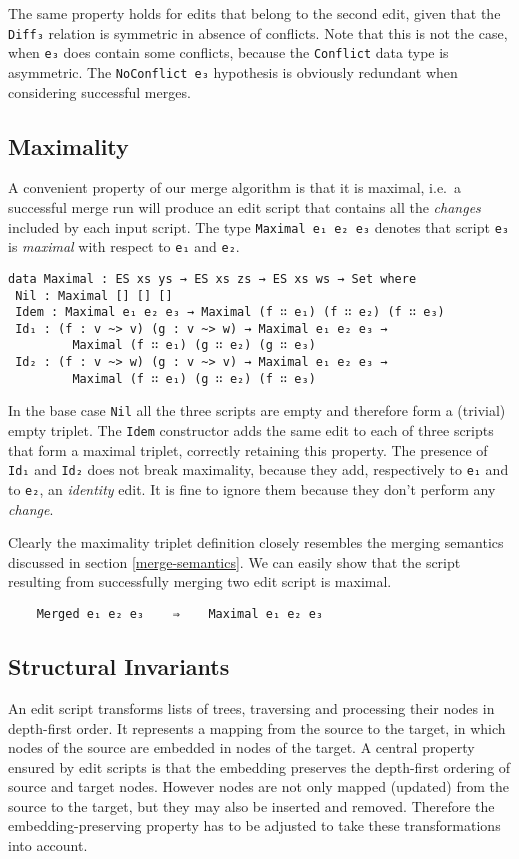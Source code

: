 \documentclass[preprint]{sigplanconf}
\begin{document}
    The same property holds for edits that belong to the second edit, given
    that the \texttt{Diff₃} relation is symmetric in absence of conflicts.	
    Note that this is not the case, when \texttt{e₃} does contain some conflicts,
    because the \texttt{Conflict} data type is asymmetric.
    The \texttt{NoConflict e₃} hypothesis is obviously redundant when
    considering successful merges.
    		
    \subsection{Maximality}
    A convenient property of our merge algorithm is that it is maximal, i.e.\ a successful 
    merge run will produce an edit script that contains all the \emph{changes} included
    by each input script. The type \texttt{Maximal e₁ e₂ e₃} denotes that  
    script \texttt{e₃} is \emph{maximal} with respect to \texttt{e₁} and \texttt{e₂}.
	
\begin{verbatim}
data Maximal : ES xs ys → ES xs zs → ES xs ws → Set where
 Nil : Maximal [] [] []
 Idem : Maximal e₁ e₂ e₃ → Maximal (f ∷ e₁) (f ∷ e₂) (f ∷ e₃)
 Id₁ : (f : v ~> v) (g : v ~> w) → Maximal e₁ e₂ e₃ → 
         Maximal (f ∷ e₁) (g ∷ e₂) (g ∷ e₃)
 Id₂ : (f : v ~> w) (g : v ~> v) → Maximal e₁ e₂ e₃ → 
         Maximal (f ∷ e₁) (g ∷ e₂) (f ∷ e₃)
\end{verbatim}

    In the base case \texttt{Nil} all the three scripts
    are empty and therefore form a (trivial) empty triplet.
    The \texttt{Idem} constructor adds the same edit to each of three scripts 
    that form a maximal triplet, correctly retaining this property.
    The presence of \texttt{Id₁} and \texttt{Id₂} does not break maximality, because
    they add, respectively to \texttt{e₁} and to \texttt{e₂}, an \emph{identity} edit.
    It is fine to ignore them because they don't perform any \emph{change}.

    Clearly the maximality triplet definition closely resembles the merging semantics discussed
    in section \ref{merge-semantics}. We can easily show that the script resulting from
    successfully merging two edit script is maximal.
\begin{verbatim}
    Merged e₁ e₂ e₃    ⇒    Maximal e₁ e₂ e₃
\end{verbatim}

    \subsection{Structural  Invariants}
    An edit script transforms lists of trees, traversing and processing 
    their nodes in depth-first order.
    It represents a mapping from the source to the target, in which 
    nodes of the source are embedded in nodes of the target.
    A central property ensured by edit scripts is that the 
    embedding preserves the depth-first ordering of source and target nodes.
    However nodes are not only mapped (updated) from the source to the 
    target, but they may also be inserted and removed. 
    Therefore the embedding-preserving property has to be adjusted to
    take these transformations into account.
\end{document}
